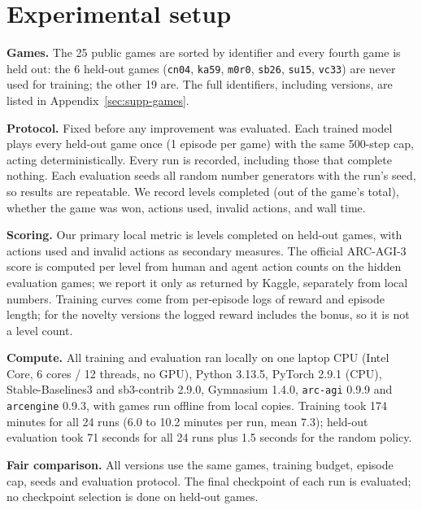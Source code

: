 \documentclass[10pt]{article}
\begin{document}
\section{Experimental setup}
\label{sec:setup}

\textbf{Games.} The 25 public games are sorted by identifier and every fourth game is held out: the 6 held-out games (\texttt{cn04}, \texttt{ka59}, \texttt{m0r0}, \texttt{sb26}, \texttt{su15}, \texttt{vc33}) are never used for training; the other 19 are. The full identifiers, including versions, are listed in Appendix~\ref{sec:supp-games}.

\textbf{Protocol.} Fixed before any improvement was evaluated. Each trained model plays every held-out game once (1 episode per game) with the same 500-step cap, acting deterministically. Every run is recorded, including those that complete nothing. Each evaluation seeds all random number generators with the run's seed, so results are repeatable. We record levels completed (out of the game's total), whether the game was won, actions used, invalid actions, and wall time.

\textbf{Scoring.} Our primary local metric is levels completed on held-out games, with actions used and invalid actions as secondary measures. The official ARC-AGI-3 score is computed per level from human and agent action counts on the hidden evaluation games; we report it only as returned by Kaggle, separately from local numbers. Training curves come from per-episode logs of reward and episode length; for the novelty versions the logged reward includes the bonus, so it is not a level count.

\textbf{Compute.} All training and evaluation ran locally on one laptop CPU (Intel Core, 6 cores / 12 threads, no GPU), Python 3.13.5, PyTorch 2.9.1 (CPU), Stable-Baselines3 and sb3-contrib 2.9.0, Gymnasium 1.4.0, \texttt{arc-agi} 0.9.9 and \texttt{arcengine} 0.9.3, with games run offline from local copies. Training took 174 minutes for all 24 runs (6.0 to 10.2 minutes per run, mean 7.3); held-out evaluation took 71 seconds for all 24 runs plus 1.5 seconds for the random policy.

\textbf{Fair comparison.} All versions use the same games, training budget, episode cap, seeds and evaluation protocol. The final checkpoint of each run is evaluated; no checkpoint selection is done on held-out games.

\end{document}

